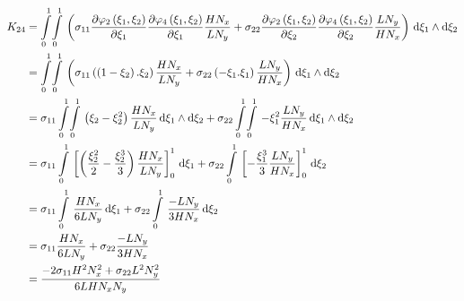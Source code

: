 \begin{equation}
  \begin{aligned}
    K_{24}&=\giint{0}{1}{0}{1}{\pbrac{\sigma_{11}\delby{\lbfn{2}{\xi_{1},\xi_{2}}}{\xi_{1}}\delby{\lbfn{4}{\xi_{1},\xi_{2}}}{\xi_{1}}
        \dfrac{H N_{x}}{L N_{y}}+\sigma_{22}\delby{\lbfn{2}{\xi_{1},\xi_{2}}}{\xi_{2}}\delby{\lbfn{4}{\xi_{1},\xi_{2}}}{\xi_{2}}
        \dfrac{L N_{y}}{H N_{x}}}}{\xi_{1}}{\xi_{2}}\\
    &=\giint{0}{1}{0}{1}{\pbrac{\sigma_{11}\pbrac{\pbrac{1-\xi_{2}}.\xi_{2}}\dfrac{H N_{x}}{L N_{y}}+
    \sigma_{22}\pbrac{-\xi_{1}.\xi_{1}}\dfrac{L N_{y}}{H N_{x}}}}{\xi_{1}}{\xi_{2}} \\
    &=\sigma_{11}\giint{0}{1}{0}{1}{\pbrac{\xi_{2}-\xi_{2}^{2}}\dfrac{H N_{x}}{L N_{y}}}{\xi_{1}}{\xi_{2}}+
    \sigma_{22}\giint{0}{1}{0}{1}{-\xi_{1}^{2}\dfrac{L N_{y}}{H N_{x}}}{\xi_{1}}{\xi_{2}} \\
    &=\sigma_{11}\gint{0}{1}{\sqbrac{\pbrac{\dfrac{\xi_{2}^{2}}{2}-\dfrac{\xi_{2}^{3}}{3}}\dfrac{H N_{x}}{L N_{y}}}_{0}^{1}}{\xi_{1}}+
    \sigma_{22}\gint{0}{1}{\sqbrac{-\dfrac{\xi_{1}^{3}}{3}\dfrac{L N_{y}}{H N_{x}}}_{0}^{1}}{\xi_{2}} \\
    &=\sigma_{11}\gint{0}{1}{\dfrac{H N_{x}}{6 L N_{y}}}{\xi_{1}}+\sigma_{22}\gint{0}{1}{\dfrac{-L N_{y}}{3 H N_{x}}}{\xi_{2}} \\
    &=\sigma_{11}\dfrac{H N_{x}}{6 L N_{y}}+\sigma_{22}\dfrac{-L N_{y}}{3 H N_{x}} \\
    &=\dfrac{-2 \sigma_{11} H^{2}N_{x}^{2}+\sigma_{22}L^{2}N_{y}^{2}}{6 L H N_{x} N_{y}}
  \end{aligned}
\end{equation}

